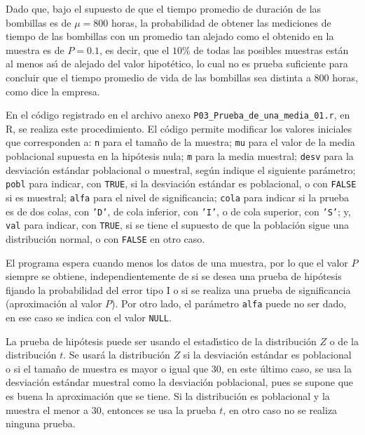 \begin{solucion}
 \begin{conclusion}
  Dado que, bajo el supuesto de que el tiempo promedio de duraci\'on de las bombillas es de $\mu = 800$ horas, la probabilidad de obtener las mediciones de tiempo de las bombillas con un promedio tan alejado como el obtenido en la muestra es de $P = 0.1$, es decir, que el $10\%$ de todas las posibles muestras est\'an al menos as\'{\i} de alejado del valor hipot\'etico, lo cual no es prueba suficiente para concluir que el tiempo promedio de vida de las bombillas sea distinta a $800$ horas, como dice la empresa.
 \end{conclusion}
 En el c\'odigo registrado en el archivo anexo \texttt{P03\_Prueba\_de\_una\_media\_01.r}, en R, se realiza este procedimiento. El c\'odigo permite modificar los valores iniciales que corresponden a: \texttt{n} para el tama\~no de la muestra; \texttt{mu} para el valor de la media poblacional supuesta en la hip\'otesis nula; \texttt{m} para la media muestral; \texttt{desv} para la desviaci\'on est\'andar poblacional o muestral, seg\'un indique el siguiente par\'ametro; \texttt{pobl} para indicar, con \texttt{TRUE}, si la desviaci\'on est\'andar es poblacional, o con \texttt{FALSE} si es muestral; \texttt{alfa} para el nivel de significancia; \texttt{cola} para indicar si la prueba es de dos colas, con \texttt{'D'}, de cola inferior, con \texttt{'I'}, o de cola superior, con \texttt{'S'}; y, \texttt{val} para indicar, con \texttt{TRUE}, si se tiene el supuesto de que la poblaci\'on sigue una distribuci\'on normal, o con \texttt{FALSE} en otro caso.
 \par 
 El programa espera cuando menos los datos de una muestra, por lo que el valor $P$ siempre se obtiene, independientemente de si se desea una prueba de hip\'otesis fijando la probabilidad del error tipo I o si se realiza una prueba de significancia (aproximaci\'on al valor $P$). Por otro lado, el par\'ametro \texttt{alfa} puede no ser dado, en ese caso se indica con el valor \texttt{NULL}.
 \par 
 La prueba de hip\'otesis puede ser usando el estad\'{\i}stico de la distribuci\'on $Z$ o de la distribuci\'on $t$. Se usar\'a la distribuci\'on $Z$ si la desviaci\'on est\'andar es poblacional o si el tama\~no de muestra es mayor o igual que $30$, en este \'ultimo caso, se usa la desviaci\'on est\'andar muestral como la desviaci\'on poblacional, pues se supone que es buena la aproximaci\'on que se tiene. Si la distribuci\'on es poblacional y la muestra el menor a $30$, entonces se usa la prueba $t$, en otro caso no se realiza ninguna prueba.

\end{solucion}
